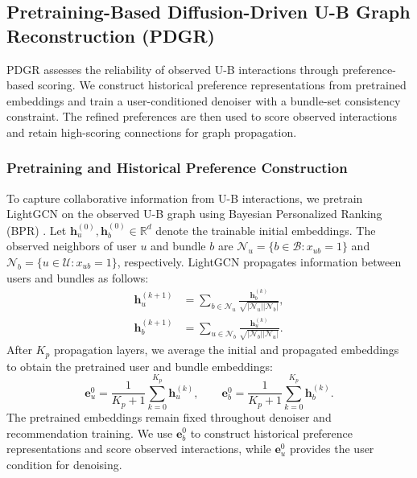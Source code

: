 \documentclass[letterpaper,journal]{IEEEtran}
\begin{document}
\subsection{Pretraining-Based Diffusion-Driven U-B Graph Reconstruction (PDGR)}\label{sec:graph-reconstruction}

PDGR assesses the reliability of observed U-B interactions through preference-based scoring. We construct historical preference representations from pretrained embeddings and train a user-conditioned denoiser with a bundle-set consistency constraint. The refined preferences are then used to score observed interactions and retain high-scoring connections for graph propagation.

\subsubsection{Pretraining and Historical Preference Construction}

To capture collaborative information from U-B interactions, we pretrain LightGCN \cite{he2020lightgcn} on the observed U-B graph using Bayesian Personalized Ranking (BPR) \cite{rendle2009bpr}. Let $\mathbf h_u^{(0)},\mathbf h_b^{(0)}\in\mathbb R^d$ denote the trainable initial embeddings. The observed neighbors of user $u$ and bundle $b$ are $\mathcal N_u=\{b\in\mathcal B:x_{ub}=1\}$ and $\mathcal N_b=\{u\in\mathcal U:x_{ub}=1\}$, respectively. LightGCN propagates information between users and bundles as follows:
\begin{equation}
\begin{aligned}
\mathbf h_u^{(k+1)}
&=\sum_{b\in\mathcal N_u}
\frac{\mathbf h_b^{(k)}}
{\sqrt{|\mathcal N_u||\mathcal N_b|}},\\
\mathbf h_b^{(k+1)}
&=\sum_{u\in\mathcal N_b}
\frac{\mathbf h_u^{(k)}}
{\sqrt{|\mathcal N_b||\mathcal N_u|}}.
\end{aligned}
\tag{1}
\end{equation}
After $K_p$ propagation layers, we average the initial and propagated embeddings to obtain the pretrained user and bundle embeddings:
\begin{equation}
\mathbf e_u^0=\frac{1}{K_p+1}\sum_{k=0}^{K_p}\mathbf h_u^{(k)},
\qquad
\mathbf e_b^0=\frac{1}{K_p+1}\sum_{k=0}^{K_p}\mathbf h_b^{(k)}.
\tag{2}
\end{equation}
The pretrained embeddings remain fixed throughout denoiser and recommendation training. We use $\mathbf e_b^0$ to construct historical preference representations and score observed interactions, while $\mathbf e_u^0$ provides the user condition for denoising.
\end{document}
